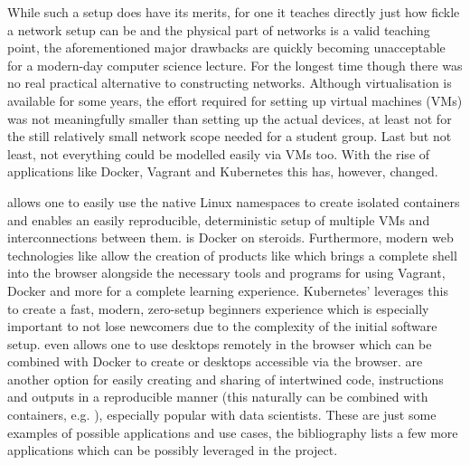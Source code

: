 While such a setup does have its merits, for one it teaches directly just how fickle a network setup can be and the physical part of networks is a valid teaching point, the aforementioned major drawbacks are quickly becoming unacceptable for a modern-day computer science lecture.
For the longest time though there was no real practical alternative to constructing networks.
Although virtualisation is available for some years, the effort required for setting up virtual machines (VMs) was not meaningfully smaller than setting up the actual devices, at least not for the still relatively small network scope needed for a student group.
Last but not least, not everything could be modelled easily via VMs too.
With the rise of applications like Docker, Vagrant and Kubernetes this has, however, changed.

 allows one to easily use the native Linux namespaces to create isolated containers and  enables an easily reproducible, deterministic setup of multiple VMs and interconnections between them.  is Docker on steroids.
Furthermore, modern web technologies like  allow the creation of products like  which brings a complete shell into the browser
alongside the necessary tools and programs for using Vagrant,
Docker and more for a complete learning experience.
Kubernetes'  leverages this to create a fast, modern, zero-setup beginners experience which is especially important to not lose newcomers due to the complexity of the initial software setup.
 even allows one to use desktops remotely in the browser which can be combined with Docker to create  or desktops accessible via the browser.
 are another option for easily creating and sharing of intertwined code, instructions and outputs in a reproducible manner (this naturally can be combined with containers, e.g. ), especially popular with data scientists.
These are just some examples of possible applications and use cases, the bibliography lists a few more applications which can be possibly leveraged in the project.

